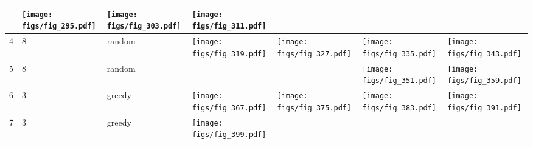 \documentclass[oneside,canadian,landscape]{article}
\begin{document}
\begin{center}
\begin{longtable}{|l|l|l||l|l|l|l|}
&\begin{minipage}{3.5cm}
\texttt{[image: figs/fig\_295.pdf]}
\end{minipage}
&\begin{minipage}{3.5cm}
\texttt{[image: figs/fig\_303.pdf]}
\end{minipage}
&\begin{minipage}{3.5cm}
\texttt{[image: figs/fig\_311.pdf]}
\end{minipage}
\\ \hline
4&8&random&\begin{minipage}{3.5cm}
\texttt{[image: figs/fig\_319.pdf]}
\end{minipage}
&\begin{minipage}{3.5cm}
\texttt{[image: figs/fig\_327.pdf]}
\end{minipage}
&\begin{minipage}{3.5cm}
\texttt{[image: figs/fig\_335.pdf]}
\end{minipage}
&\begin{minipage}{3.5cm}
\texttt{[image: figs/fig\_343.pdf]}
\end{minipage}
\\ \hline
5&8&random&&&\begin{minipage}{3.5cm}
\texttt{[image: figs/fig\_351.pdf]}
\end{minipage}
&\begin{minipage}{3.5cm}
\texttt{[image: figs/fig\_359.pdf]}
\end{minipage}
\\ \hline
6&3&greedy&\begin{minipage}{3.5cm}
\texttt{[image: figs/fig\_367.pdf]}
\end{minipage}
&\begin{minipage}{3.5cm}
\texttt{[image: figs/fig\_375.pdf]}
\end{minipage}
&\begin{minipage}{3.5cm}
\texttt{[image: figs/fig\_383.pdf]}
\end{minipage}
&\begin{minipage}{3.5cm}
\texttt{[image: figs/fig\_391.pdf]}
\end{minipage}
\\ \hline
7&3&greedy&\begin{minipage}{3.5cm}
\texttt{[image: figs/fig\_399.pdf]}
\end{minipage}
&\begin{minipage}{3.5cm}

\end{minipage}
\end{longtable}
\end{center}
\end{document}
